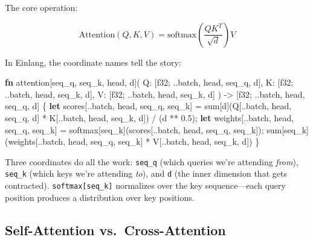 \documentclass[11pt,titlepage]{article}
\newenvironment{Shaded}{}{}
\newcommand{\DataTypeTok}[1]{\textcolor[rgb]{0.56,0.13,0.00}{#1}}
\newcommand{\DecValTok}[1]{\textcolor[rgb]{0.25,0.63,0.44}{#1}}
\newcommand{\KeywordTok}[1]{\textcolor[rgb]{0.00,0.44,0.13}{\textbf{#1}}}
\newcommand{\NormalTok}[1]{#1}
\newcommand{\OperatorTok}[1]{\textcolor[rgb]{0.40,0.40,0.40}{#1}}
\begin{document}
The core operation:

\[\text{Attention}(Q, K, V) = \text{softmax}\left(\frac{QK^T}{\sqrt{d}}\right)V\]

In Einlang, the coordinate names tell the story:

\begin{Shaded}
\begin{Highlighting}[]
\KeywordTok{fn}\NormalTok{ attention[seq_q, seq_k, head, d](}
\NormalTok{    Q: }\OperatorTok{[}\DataTypeTok{f32}\NormalTok{; ..batch, head, seq_q, d}\OperatorTok{]}\NormalTok{,}
\NormalTok{    K: }\OperatorTok{[}\DataTypeTok{f32}\NormalTok{; ..batch, head, seq_k, d}\OperatorTok{]}\NormalTok{,}
\NormalTok{    V: }\OperatorTok{[}\DataTypeTok{f32}\NormalTok{; ..batch, head, seq_k, d}\OperatorTok{]}
\NormalTok{) -> }\OperatorTok{[}\DataTypeTok{f32}\NormalTok{; ..batch, head, seq_q, d}\OperatorTok{]}
\OperatorTok{\{}
    \KeywordTok{let}\NormalTok{ scores}\OperatorTok{[}\NormalTok{..batch, head, seq_q, seq_k}\OperatorTok{]}\NormalTok{ =}
\NormalTok{        sum}\OperatorTok{[}\NormalTok{d}\OperatorTok{]}\NormalTok{(Q}\OperatorTok{[}\NormalTok{..batch, head, seq_q, d}\OperatorTok{]}\NormalTok{ * K}\OperatorTok{[}\NormalTok{..batch, head, seq_k, d}\OperatorTok{]}\NormalTok{) / (d ** }\DecValTok{0.5}\NormalTok{);}
    \KeywordTok{let}\NormalTok{ weights}\OperatorTok{[}\NormalTok{..batch, head, seq_q, seq_k}\OperatorTok{]}\NormalTok{ = softmax}\OperatorTok{[}\NormalTok{seq_k}\OperatorTok{]}\NormalTok{(scores}\OperatorTok{[}\NormalTok{..batch, head, seq_q, seq_k}\OperatorTok{]}\NormalTok{);}
\NormalTok{    sum}\OperatorTok{[}\NormalTok{seq_k}\OperatorTok{]}\NormalTok{(weights}\OperatorTok{[}\NormalTok{..batch, head, seq_q, seq_k}\OperatorTok{]}\NormalTok{ * V}\OperatorTok{[}\NormalTok{..batch, head, seq_k, d}\OperatorTok{]}\NormalTok{)}
\OperatorTok{\}}
\end{Highlighting}
\end{Shaded}

Three coordinates do all the work: \texttt{seq\_q} (which queries we're
attending \emph{from}), \texttt{seq\_k} (which keys we're attending
\emph{to}), and \texttt{d} (the inner dimension that gets contracted).
\texttt{softmax{[}seq\_k{]}} normalizes over the key sequence---each
query position produces a distribution over key positions.

\vspace{2em}

\hypertarget{self-attention-vs.cross-attention}{%
\subsection{Self-Attention
vs.~Cross-Attention}\label{self-attention-vs.cross-attention}}
\end{document}
